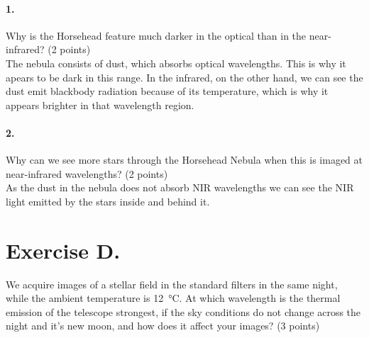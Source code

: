 \documentclass[11pt,a4paper,twoside]{article}
\begin{document}
\paragraph{1.} Why is the Horsehead feature much darker in the optical than in
the near-infrared? (2 points)  \\

The nebula consists of dust, which absorbs optical wavelengths. This is why it
apears to be dark in this range. In the infrared, on the other hand, we can see the dust emit blackbody radiation because of its temperature, which is
why it appears brighter in that wavelength region. 

\paragraph{2.} Why can we see more stars through the Horsehead Nebula when this
is imaged at near-infrared wavelengths? (2 points) \\

As the dust in the nebula does not absorb NIR wavelengths we can see the NIR 
light emitted by the stars inside and behind it.




%
%
%


\section*{Exercise D.}

We acquire images of a stellar field in the standard filters in the same night,
while the ambient temperature is \SI{12}{\celsius}. At which wavelength is the
thermal emission of the telescope strongest, if the sky conditions do not
change across the night and it's new moon, and how does it affect your images?
(3 points) \\
\end{document}
